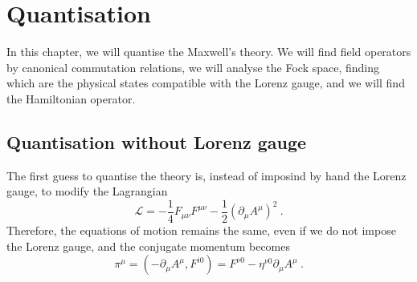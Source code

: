 \chapter{Quantisation}

    In this chapter, we will quantise the Maxwell's theory. We will find field operators by canonical commutation relations, we will analyse the Fock space, finding which are the physical states compatible with the Lorenz gauge, and we will find the Hamiltonian operator.

\section{Quantisation without Lorenz gauge}

    The first guess to quantise the theory is, instead of imposind by hand the Lorenz gauge, to modify the Lagrangian 
    \begin{equation*}
        \mathcal L = - \frac{1}{4} F_{\mu\nu} F^{\mu\nu} - \frac{1}{2} (\partial_\mu A^\mu)^2 ~. 
    \end{equation*}
    Therefore, the equations of motion remains the same, even if we do not impose the Lorenz gauge, and the conjugate momentum becomes
    \begin{equation*}
        \pi^\mu = (- \partial_\mu A^\mu, F^{i0}) = F^{\nu 0} - \eta^{\nu 0} \partial_\mu A^\mu ~.
    \end{equation*}
